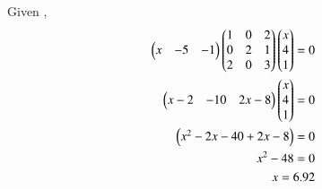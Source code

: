 Given ,
\begin{align}
\myvec{x & -5 & -1}\myvec{1 & 0 & 2 \\ 0 & 2 & 1 \\ 2 & 0 & 3}\myvec{x \\ 4 \\ 1} = 0
\\
\myvec{x-2 & -10 & 2x-8}\myvec{x \\ 4 \\ 1} = 0
\\
\myvec{{x^2-2{x}-40+2{x}-8}} = 0
\\
{x}^2-48 = 0
\\
{x} = 6.92
\end{align}